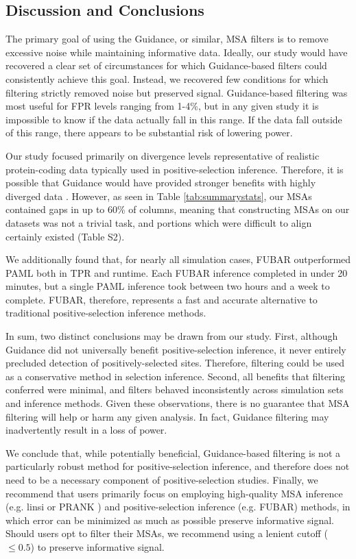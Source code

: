 \documentclass[11pt]{article}
\begin{document}
\subsection*{Discussion and Conclusions}

The primary goal of using the Guidance, or similar, MSA filters is to remove excessive noise while maintaining informative data. Ideally, our study would have recovered a clear set of circumstances for which Guidance-based filters could consistently achieve this goal. Instead, we recovered few conditions for which filtering strictly removed noise but preserved signal. Guidance-based filtering was most useful for FPR levels ranging from 1-4\%, but in any given study it is impossible to know if the data actually fall in this range. If the data fall outside of this range, there appears to be substantial risk of lowering power.

Our study focused primarily on divergence levels representative of realistic protein-coding data typically used in positive-selection inference. Therefore, it is possible that Guidance would have provided stronger benefits with highly diverged data \citep{Privman2012}. However, as seen in Table \ref{tab:summarystats}, our MSAs contained gaps in up to 60\% of columns, meaning that constructing MSAs on our datasets was not a trivial task, and portions which were difficult to align certainly existed (Table S2).

We additionally found that, for nearly all simulation cases, FUBAR outperformed PAML both in TPR and runtime. Each FUBAR inference completed in under 20 minutes, but a single PAML inference took between two hours and a week to complete. FUBAR, therefore, represents a fast and accurate alternative to traditional positive-selection inference methods.

In sum, two distinct conclusions may be drawn from our study. First, although Guidance did not universally benefit positive-selection inference, it never entirely precluded detection of positively-selected sites. Therefore, filtering could be used as a conservative method in selection inference. Second, all benefits that filtering conferred were minimal, and filters behaved inconsistently across simulation sets and inference methods. Given these observations, there is no guarantee that MSA filtering will help or harm any given analysis. In fact,  Guidance filtering may inadvertently result in a loss of power. 

We conclude that, while potentially beneficial, Guidance-based filtering is not a particularly robust method for positive-selection inference, and therefore does not need to be a necessary component of positive-selection studies. Finally, we recommend that users primarily focus on employing high-quality MSA inference (e.g. linsi \citep{Katoh2005} or PRANK \citep{Loytynoja2008}) and positive-selection inference (e.g. FUBAR) methods, in which error can be minimized as much as possible preserve informative signal. Should users opt to filter their MSAs, we recommend using a lenient cutoff ($\leq0.5$) to preserve informative signal.
\end{document}
